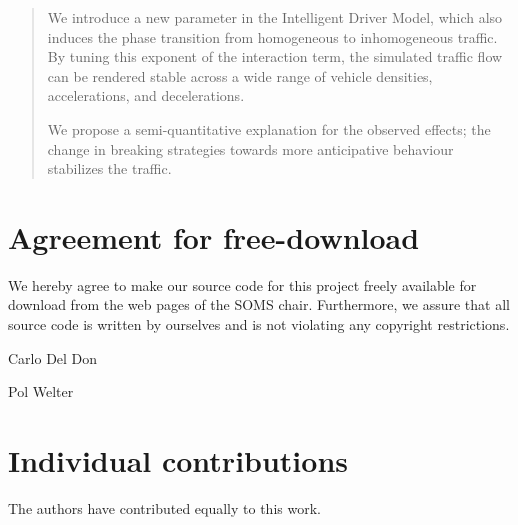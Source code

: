 




\begin{abstract}
We introduce a new parameter in the Intelligent Driver Model, which also induces the phase transition from homogeneous to inhomogeneous traffic. By tuning this exponent of the interaction term, the simulated traffic flow can be rendered stable across a wide range of vehicle densities, accelerations, and decelerations.

We propose a semi-quantitative explanation for the observed effects; the change in breaking strategies towards more anticipative  behaviour stabilizes the traffic.
\end{abstract}
\newpage


\newpage
\section*{Agreement for free-download}
\bigskip\bigskip
\large We hereby agree to make our source code for this project freely available for download from the web pages of the SOMS chair. Furthermore, we assure that all source code is written by ourselves and is not violating any copyright restrictions.

\begin{minipage}[t][2cm][b]{0.45\textwidth}
    \centering Carlo Del Don
\end{minipage}
\begin{minipage}[t][2cm][b]{0.45\textwidth}
    \centering Pol Welter
\end{minipage}

\vspace{5cm}
\section*{Individual contributions}
\bigskip\bigskip
The authors have contributed equally to this work.

\newpage

\tableofcontents

\newpage











\cleardoublepage





  



 
